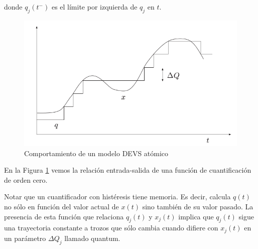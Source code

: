 \documentclass[a4paper,	11pt]{report}
\begin{document}
donde $q_j (t^{-})$ es el límite por izquierda de $q_j$ en $t$.

\begin{figure}[!htbp]
  \includegraphics[scale=0.5]{histeresis1}
  \caption{Comportamiento de un modelo DEVS atómico}
   \label{fig:fig2-2}
\end{figure}

En la Figura \ref{fig:fig2-2} vemos la relación entrada-salida de una función de cuantificación de orden cero.

Notar que un cuantificador con histéresis tiene memoria. Es decir, calcula $q(t)$ no sólo en función del valor actual de $x(t)$ sino también de su valor pasado.
La presencia de esta función que relaciona $q_j (t)$ y $x_j (t)$ implica que $q_j (t)$ sigue una trayectoria constante a trozos que sólo cambia cuando difiere con $x_j (t)$ en un parámetro $\Delta Q_j$ llamado quantum.
\end{document}
